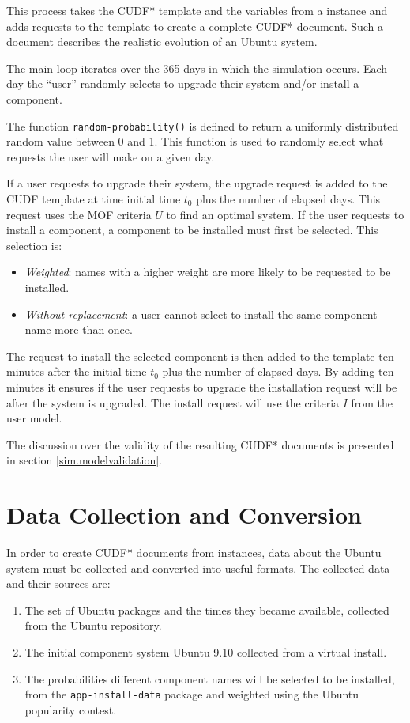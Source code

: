 This process takes the CUDF* template and the variables from a \usermodel instance and adds requests to the template to  create a complete CUDF* document.
Such a document describes the realistic evolution of an Ubuntu system.

The main loop iterates over the 365 days in which the simulation occurs.
Each day the ``user'' randomly selects to upgrade their system and/or install a component.

The function \texttt{random-probability()} is defined to return a uniformly distributed random value between 0 and 1.
This function is used to randomly select what requests the user will make on a given day.

If a user requests to upgrade their system, the upgrade request is added to the CUDF template at time initial time $t_0$ plus the number of elapsed days.
This request uses the MOF criteria $U$ to find an optimal system.
If the user requests to install a component, a component to be installed must first be selected.
This selection is: 
\begin{itemize}
  \item \textit{Weighted}: names with a higher weight are more likely to be requested to be installed.
  \item \textit{Without replacement}: a user cannot select to install the same component name more than once.
\end{itemize} 
The request to install the selected component is then added to the template ten minutes after the initial time $t_0$ plus the number of elapsed days.
By adding ten minutes it ensures if the user requests to upgrade the installation request will be after the system is upgraded.
The install request will use the criteria $I$ from the user model.

The discussion over the validity of the resulting CUDF* documents is presented in section \ref{sim.modelvalidation}.

\section{\usermodel Data Collection and Conversion}
\label{sim.collection}
In order to create CUDF* documents from \usermodel instances, data about the Ubuntu system must be collected and converted into useful formats.
The collected data and their sources are:
\begin{enumerate}
  \item The set of Ubuntu packages and the times they became available, collected from the Ubuntu repository.
  \item The initial component system Ubuntu 9.10 collected from a virtual install.
  \item The probabilities different component names will be selected to be installed, from the \texttt{app-install-data} package and weighted using the Ubuntu popularity contest.
\end{enumerate}

